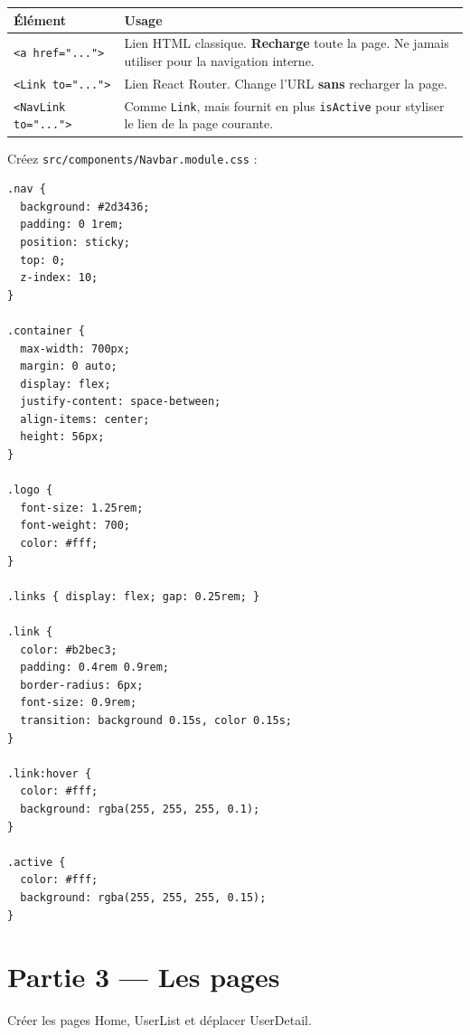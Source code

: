 \documentclass[11pt,a4paper]{article}
\begin{document}
\begin{attentionbox}
\begin{center}
\begin{tabular}{lp{8cm}}
\toprule
\textbf{Élément} & \textbf{Usage} \\
\midrule
\texttt{<a href="...">} & Lien HTML classique. \textbf{Recharge} toute la page. Ne jamais utiliser pour la navigation interne. \\
\texttt{<Link to="...">} & Lien React Router. Change l'URL \textbf{sans} recharger la page. \\
\texttt{<NavLink to="...">} & Comme \texttt{Link}, mais fournit en plus \texttt{isActive} pour styliser le lien de la page courante. \\
\bottomrule
\end{tabular}
\end{center}
\end{attentionbox}

Créez \texttt{src/components/Navbar.module.css} :

\begin{lstlisting}[style=css]
.nav {
  background: #2d3436;
  padding: 0 1rem;
  position: sticky;
  top: 0;
  z-index: 10;
}

.container {
  max-width: 700px;
  margin: 0 auto;
  display: flex;
  justify-content: space-between;
  align-items: center;
  height: 56px;
}

.logo {
  font-size: 1.25rem;
  font-weight: 700;
  color: #fff;
}

.links { display: flex; gap: 0.25rem; }

.link {
  color: #b2bec3;
  padding: 0.4rem 0.9rem;
  border-radius: 6px;
  font-size: 0.9rem;
  transition: background 0.15s, color 0.15s;
}

.link:hover {
  color: #fff;
  background: rgba(255, 255, 255, 0.1);
}

.active {
  color: #fff;
  background: rgba(255, 255, 255, 0.15);
}
\end{lstlisting}

\section{Partie 3 --- Les pages}
\label{sec:pages}

\begin{objectifbox}
Créer les pages Home, UserList et déplacer UserDetail.
\end{objectifbox}
\end{document}
